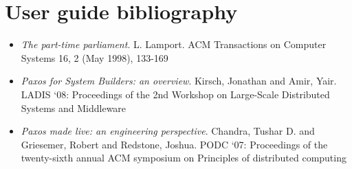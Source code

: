\section{User guide bibliography}
\label{bibliography:bibliography}\label{bibliography::doc}\begin{itemize}
\item {} 
\emph{The part-time parliament}.
L. Lamport.
ACM Transactions on Computer Systems 16, 2 (May 1998), 133-169

\item {} 
\emph{Paxos for System Builders: an overview}.
Kirsch, Jonathan and Amir, Yair.
LADIS `08: Proceedings of the 2nd Workshop on Large-Scale Distributed Systems and Middleware

\item {} 
\emph{Paxos made live: an engineering perspective}.
Chandra, Tushar D. and Griesemer, Robert and Redstone, Joshua.
PODC `07: Proceedings of the twenty-sixth annual ACM symposium on Principles of distributed computing

\end{itemize}

\clearpage
